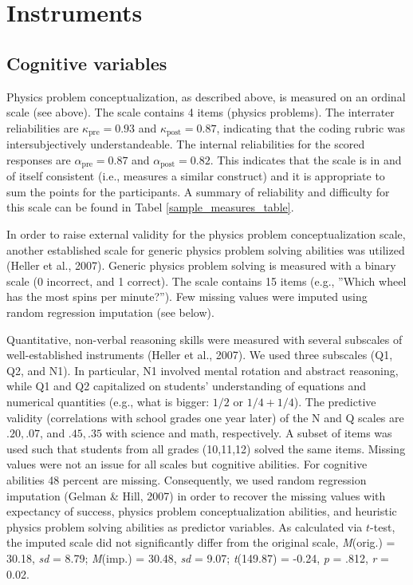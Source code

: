 \documentclass[D:/studies/WinnerS/Erhebungen/IPhO1718/paper/problem_solving/main/TaylorFrancis/interactapasample]{subfiles}
\begin{document}
\section{Instruments}



\subsection{Cognitive variables} 

Physics problem conceptualization, as described above, is measured on an ordinal scale (see above). The scale contains 4 items (physics problems). The interrater reliabilities are $\kappa_{\text{pre}}=0.93$ and $\kappa_{\text{post}}=0.87$, indicating that the coding rubric was intersubjectively understandeable. The internal reliabilities for the scored responses are $\alpha_{\text{pre}}=0.87$ and $\alpha_{\text{post}}=0.82$. This indicates that the scale is in and of itself consistent (i.e., measures a similar construct) and it is appropriate to sum the points for the participants. A summary of reliability and difficulty for this scale can be found in Tabel \ref{sample_measures_table}.

In order to raise external validity for the physics problem conceptualization scale, another established scale for generic physics problem solving abilities was utilized (Heller et al., 2007). Generic physics problem solving is measured with a binary scale (0 incorrect, and 1 correct). The scale contains 15 items (e.g., ''Which wheel has the most spins per minute?''). Few missing values were imputed using random regression imputation (see below).

Quantitative, non-verbal reasoning skills were measured with several subscales of well-established instruments (Heller et al., 2007). We used three subscales (Q1, Q2, and N1). In particular, N1 involved mental rotation and abstract reasoning, while Q1 and Q2 capitalized on students' understanding of equations and numerical quantities (e.g., what is bigger: $1/2$ or $1/4+1/4$). The predictive validity (correlations with school grades one year later) of the N and Q scales are $.20,.07$, and $.45,.35$ with science and math, respectively. A subset of items was used such that students from all grades (10,11,12) solved the same items. Missing values were not an issue for all scales but cognitive abilities. For cognitive abilities 48 percent are missing. Consequently, we used random regression imputation (Gelman \& Hill, 2007) in order to recover the missing values with expectancy of success, physics problem conceptualization abilities, and heuristic physics problem solving abilities as predictor variables. As calculated via $t$-test, the imputed scale did not significantly differ from the original scale, \textit{M}(orig.) = 30.18, \textit{sd} = 8.79; \textit{M}(imp.) = 30.48, \textit{sd} = 9.07; \textit{t}(149.87) = -0.24, \textit{p} = .812, \textit{r} = 0.02. 
\end{document}
